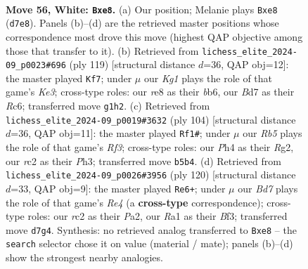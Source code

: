 \documentclass[11pt]{article}
\begin{document}
\clearpage

\begin{figure}[p]\centering
\begin{subfigure}{0.46\textwidth}\centering
\resizebox{\linewidth}{!}{%
\newchessgame
\chessboard[
  setfen={4rk2/3B1p2/6p1/1R6/7P/1P6/2r3b1/R5K1 w - - 2 56},
  showmover=false,
  pgfstyle=straightmove, color=movearrow, markmove={d7-e8}
]}
\caption{}
\end{subfigure}\hfill
\begin{subfigure}{0.46\textwidth}\centering
\resizebox{\linewidth}{!}{%
\newchessgame
\chessboard[
  setfen={6R1/8/1Br1kp2/P7/6P1/5RK1/8/2r5 b - - 1 60},
  showmover=false,
  pgfstyle=straightmove, color=movearrow, markmove={e6-f7}
]}
\caption{}
\end{subfigure}
\\[4pt]
\begin{subfigure}{0.46\textwidth}\centering
\resizebox{\linewidth}{!}{%
\newchessgame
\chessboard[
  setfen={8/P4P2/7p/2p2K2/2npB3/5R1P/6R1/1rk5 w - - 0 53},
  showmover=false,
  pgfstyle=straightmove, color=movearrow, markmove={f3-f1}
]}
\caption{}
\end{subfigure}\hfill
\begin{subfigure}{0.46\textwidth}\centering
\resizebox{\linewidth}{!}{%
\newchessgame
\chessboard[
  setfen={8/8/1k6/p1p3r1/1r2R3/5B2/P1R2K2/8 w - - 4 61},
  showmover=false,
  pgfstyle=straightmove, color=movearrow, markmove={e4-e6}
]}
\caption{}
\end{subfigure}
\caption{\textbf{Move 56, White: \texttt{Bxe8}.} (a) Our position; Melanie plays \texttt{Bxe8} (\texttt{d7e8}). Panels (b)--(d) are the retrieved master positions whose correspondence most drove this move (highest QAP objective among those that transfer to it). (b) Retrieved from \texttt{lichess\_elite\_2024-09\_p0023\#696} (ply 119) [structural distance $d$=36, QAP obj=12]: the master played \texttt{Kf7}; under $\mu$ our \emph{Kg1} plays the role of that game's \emph{Ke3}; cross-type roles: our \emph{r}e8 as their \emph{b}b6, our \emph{B}d7 as their \emph{R}c6; transferred move \texttt{g1h2}. (c) Retrieved from \texttt{lichess\_elite\_2024-09\_p0019\#3632} (ply 104) [structural distance $d$=36, QAP obj=11]: the master played \texttt{Rf1\#}; under $\mu$ our \emph{Rb5} plays the role of that game's \emph{Rf3}; cross-type roles: our \emph{P}h4 as their \emph{R}g2, our \emph{r}c2 as their \emph{P}h3; transferred move \texttt{b5b4}. (d) Retrieved from \texttt{lichess\_elite\_2024-09\_p0026\#3956} (ply 120) [structural distance $d$=33, QAP obj=9]: the master played \texttt{Re6+}; under $\mu$ our \emph{Bd7} plays the role of that game's \emph{Re4} (a \textbf{cross-type} correspondence); cross-type roles: our \emph{r}c2 as their \emph{P}a2, our \emph{R}a1 as their \emph{B}f3; transferred move \texttt{d7g4}. Synthesis: no retrieved analog transferred to \texttt{Bxe8} -- the \texttt{search} selector chose it on value (material / mate); panels (b)--(d) show the strongest nearby analogies.}
\label{fig:thought-m110}
\end{figure}
\end{document}
